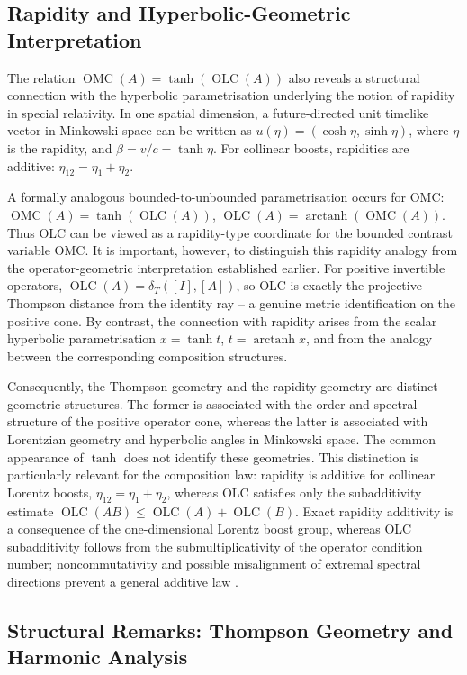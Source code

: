 \documentclass{article}
\theoremstyle{remark}
\providecommand{\QLC}{\operatorname{OLC}}
\providecommand{\QMC}{\operatorname{OMC}}
\begin{document}
\subsection{Rapidity and Hyperbolic-Geometric Interpretation}

The relation $\QMC(A)=\tanh(\QLC(A))$ also reveals a structural connection with the hyperbolic parametrisation underlying the notion of rapidity in special relativity. In one spatial dimension, a future-directed unit timelike vector in Minkowski space can be written as $u(\eta)=(\cosh\eta,\sinh\eta)$, where $\eta$ is the rapidity, and $\beta=v/c=\tanh\eta$. For collinear boosts, rapidities are additive: $\eta_{12}=\eta_1+\eta_2$.

A formally analogous bounded-to-unbounded parametrisation occurs for OMC: $\QMC(A)=\tanh(\QLC(A))$, $\QLC(A)=\operatorname{arctanh}(\QMC(A))$. Thus OLC can be viewed as a rapidity-type coordinate for the bounded contrast variable OMC. It is important, however, to distinguish this rapidity analogy from the operator-geometric interpretation established earlier. For positive invertible operators, $\QLC(A)=\delta_T([I],[A])$, so OLC is exactly the projective Thompson distance from the identity ray -- a genuine metric identification on the positive cone. By contrast, the connection with rapidity arises from the scalar hyperbolic parametrisation $x=\tanh t$, $t=\operatorname{arctanh} x$, and from the analogy between the corresponding composition structures.

Consequently, the Thompson geometry and the rapidity geometry are distinct geometric structures. The former is associated with the order and spectral structure of the positive operator cone, whereas the latter is associated with Lorentzian geometry and hyperbolic angles in Minkowski space. The common appearance of $\tanh$ does not identify these geometries. This distinction is particularly relevant for the composition law: rapidity is additive for collinear Lorentz boosts, $\eta_{12}=\eta_1+\eta_2$, whereas OLC satisfies only the subadditivity estimate $\QLC(AB)\le\QLC(A)+\QLC(B)$. Exact rapidity additivity is a consequence of the one-dimensional Lorentz boost group, whereas OLC subadditivity follows from the submultiplicativity of the operator condition number; noncommutativity and possible misalignment of extremal spectral directions prevent a general additive law \cite{rindler2006}.

\subsection{Structural Remarks: Thompson Geometry and Harmonic Analysis}
\end{document}
